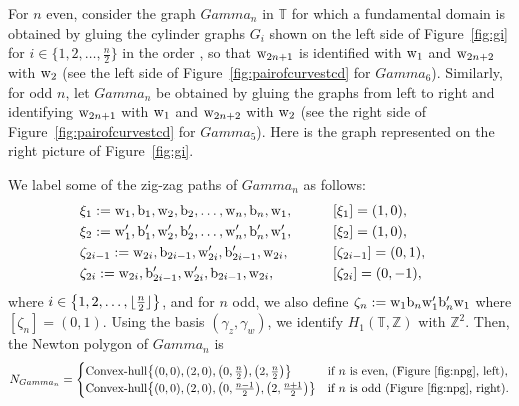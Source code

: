 \documentclass[10pt,a4paper]{amsart}
\numberwithin{equation}{section}
\DeclarePairedDelimiter\floor{\lfloor}{\rfloor}
\newcommand{\Z}{{\mathbb Z}}
\newcommand{\T}{{\mathbb T}}
\newcommand{\w}{{\rm w}}
\newcommand{\bw}{{\rm b}}
\def\Gamma{Gamma}
\begin{document}
	For $n$ even, consider the graph $\Gamma_n$ in $\T$ for which a fundamental domain is obtained by gluing the cylinder graphs $G_i$ shown on the left side of Figure~\ref{fig:gi} for $i \in \bigl\{1,2,\dots,\frac{n}{2}\bigr\}$ in the order , so that $\w_{2n+1}$ is identified with $\w_1$ and $\w_{2n+2}$ with $\w_2$ (see the left side of Figure~\ref{fig:pairofcurvestcd} for $\Gamma_6$). Similarly, for odd $n$, let $\Gamma_n$ be obtained by gluing the graphs  from left to right and identifying $\w_{2n+1}$ with $\w_1$ and $\w_{2n+2}$ with $\w_2$ (see the right side of Figure~\ref{fig:pairofcurvestcd} for $\Gamma_5$). Here  is the graph represented on the right picture of Figure~\ref{fig:gi}.
	
	
	We label some of the zig-zag paths of $\Gamma_n$ as follows:
	\begin{alignat*}{3}
		&\xi_{1}:= \w_1,\bw_1,\w_2,\bw_2,\dots,\w_{n},\bw_{n},\w_{1}, \qquad&& [\xi_1]=(1,0),&\\
		&\xi_{2}:= \w_1',\bw_1',\w_2',\bw_2',\dots,\w_{n}',\bw_{n}',\w_{1}', \qquad&& [\xi_2]=(1,0),&\\
		&\zeta_{2i-1}:= \w_{2i}, \bw_{2i-1}, \w_{2i}', \bw_{2i-1}',\w_{2i}, \qquad&& [\zeta_{2i-1}]=(0,1),&\\
		&\zeta_{2i}:= \w_{2i}, \bw_{2i-1}', \w_{2i}', \bw_{2i-1},\w_{2i}, \qquad&& [\zeta_{2i}]=(0,-1),&
	\end{alignat*}
	where $i \in \bigl\{1,2,\dots,\floor{\frac n 2}\bigr\}$, and for $n$ odd, we also define $\zeta_n := \w_1 \bw_n \w_1' \bw_n' \w_1$ where $[\zeta_n]= (0,1)$. Using the basis $(\gamma_z,\gamma_w)$, we identify $H_1(\T,\Z)$ with $\Z^2$. Then, the Newton polygon of $\Gamma_n$ is
	\begin{gather*}
	N_{\Gamma_n}= \begin{cases}
		\operatorname{Convex-hull}\bigl\{(0,0), (2,0),\bigl(0,\frac n 2 \bigr), \bigl(2,\frac n 2 \bigr)\bigr\} &\text{if $n$ is even, (Figure~\ref{fig:npg}, left),}\\
		\text{Convex-hull}\bigl\{(0,0), (2,0),\bigl(0,\frac{n-1}{2}\bigr), \bigl(2,\frac{n+1}{ 2}\bigr)\bigr\} &\text{if $n$ is odd (Figure~\ref{fig:npg}, right).}
	\end{cases}
	\end{gather*}
	
\end{document}
